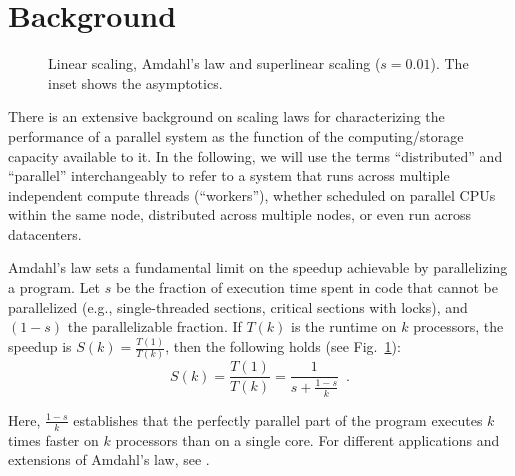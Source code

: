 \section{Background}\label{sec:background}

\begin{figure}[t]
  \centering
  \begin{small}
    
  \end{small}
  \caption{Linear scaling, Amdahl's law and superlinear scaling ($s=0.01$). The inset shows the asymptotics.}
    \label{fig:amdahl}
\end{figure}

There is an extensive background on scaling laws for characterizing the performance of a parallel system as the function of the computing\slash storage capacity available to it. In the following, we will use the terms ``distributed'' and ``parallel'' interchangeably to refer to a system that runs across multiple independent compute threads (“workers”), whether scheduled on parallel CPUs within the same node, distributed across multiple nodes, or even run across datacenters.

Amdahl's law \cite{10.1145/1465482.1465560} sets a fundamental limit on the speedup achievable by parallelizing a program.
Let $s$ be the fraction of execution time spent in code that cannot be parallelized (e.g., single-threaded sections, critical sections with locks), and $(1-s)$ the parallelizable fraction.
If $T(k)$ is the runtime on $k$ processors, the speedup is $S(k)=\frac{T(1)}{T(k)}$, then the following holds (see Fig.~\ref{fig:amdahl}):
\begin{equation}\label{eq:amdahl}
S(k) = \frac{T(1)}{T(k)} = \frac{1}{s + \frac{1-s}{k}} \enspace .
\end{equation}

Here, $\frac{1-s}{k}$ establishes that the perfectly parallel part of the program executes $k$ times faster on $k$ processors than on a single core. For different applications and extensions of Amdahl's law, see \cite{4563876, 6280307,1580395,406581,6163449, 10.5555/1951599}.

